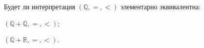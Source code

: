 Будет ли интерпретация $(\mathbb{Q}, =, <)$ элементарно эквивалентна:
\begin{enumcyr}
    \item $(\mathbb{Q} + \mathbb{Q}, =, <)$;
    \item $(\mathbb{Q} + \mathbb{R}, =, <)$.
\end{enumcyr}